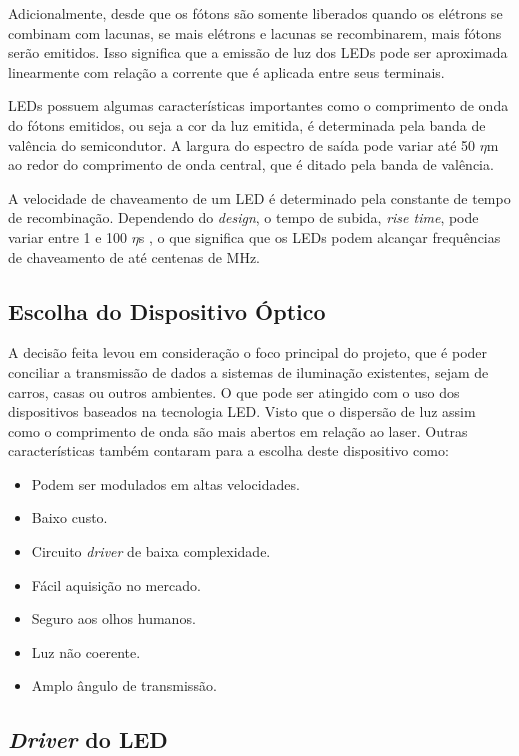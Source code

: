 Adicionalmente, desde que os fótons são somente liberados quando os elétrons se combinam com lacunas, se mais elétrons e lacunas se recombinarem, mais fótons serão emitidos. Isso significa que a emissão de luz dos LEDs pode ser aproximada linearmente com relação a corrente que é aplicada entre seus terminais.

LEDs possuem algumas características importantes como o comprimento de onda do fótons emitidos, ou seja a cor da luz emitida, é determinada pela banda de valência do semicondutor. A largura do espectro de saída pode variar até 50 $\eta$m ao redor do comprimento de onda central, que é ditado pela banda de valência.

A velocidade de chaveamento de um LED é determinado pela constante de tempo de recombinação. Dependendo do \textit{design}, o tempo de subida, \textit{rise time}, pode variar entre 1 e 100 $\eta$s \cite{friedman}, o que significa que os LEDs podem alcançar frequências de chaveamento de até centenas de MHz.


\subsection{Escolha do Dispositivo Óptico}

A decisão feita levou em consideração o foco principal do projeto, que é poder conciliar a transmissão de dados a sistemas de iluminação existentes, sejam de carros, casas ou outros ambientes. O que pode ser atingido com o uso dos dispositivos baseados na tecnologia LED. Visto que o dispersão de luz assim como o comprimento de onda são mais abertos em relação ao laser.
Outras características também contaram para a escolha deste dispositivo como: 

\begin{itemize}
\item Podem ser modulados em altas velocidades.
\item Baixo custo.
\item Circuito \textit{driver} de baixa complexidade.
\item Fácil aquisição no mercado.
\item Seguro aos olhos humanos.
\item Luz não coerente.
\item Amplo ângulo de transmissão.
\end{itemize}

\subsection{\textit{Driver} do LED}

